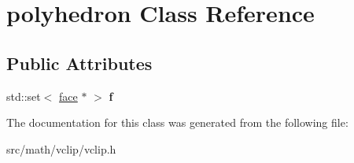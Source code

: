 \hypertarget{classpolyhedron}{
\section{polyhedron Class Reference}
\label{classpolyhedron}
}
\subsection*{Public Attributes}
\begin{DoxyCompactItemize}
\item 
\hypertarget{classpolyhedron_abfafc703e4310ed74d41261c72cd0530}{
std::set$<$ \hyperlink{classface}{face} $\ast$ $>$ {\bfseries f}}
\label{classpolyhedron_abfafc703e4310ed74d41261c72cd0530}

\end{DoxyCompactItemize}


The documentation for this class was generated from the following file:\begin{DoxyCompactItemize}
\item 
src/math/vclip/vclip.h\end{DoxyCompactItemize}
